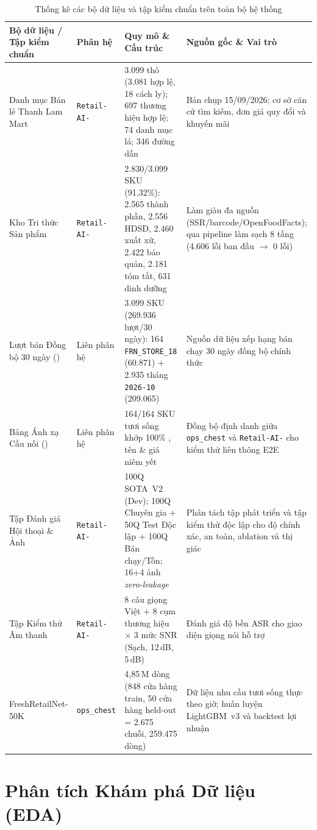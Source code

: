 \begin{table}[H]
\centering
\caption{Thống kê các bộ dữ liệu và tập kiểm chuẩn trên toàn bộ hệ thống}
\label{tab:dataset_stats}
\footnotesize
\begin{tabularx}{\textwidth}{L{3.5cm} L{2.1cm} L{3.8cm} Y}
\toprule
\textbf{Bộ dữ liệu / Tập kiểm chuẩn} & \textbf{Phân hệ} & \textbf{Quy mô \& Cấu trúc} & \textbf{Nguồn gốc \& Vai trò} \\
\midrule
Danh mục Bán lẻ Thanh Lam Mart & \texttt{Retail-AI-} & 3.099 thô (3.081 hợp lệ, 18 cách ly); 697 thương hiệu hợp lệ; 74 danh mục lá; 346 đường dẫn & Bản chụp 15/09/2026; cơ sở căn cứ tìm kiếm, đơn giá quy đổi và khuyến mãi \\
Kho Tri thức Sản phẩm & \texttt{Retail-AI-} & 2.830/3.099 SKU (91,32\%): 2.565 thành phần, 2.556 HDSD, 2.460 xuất xứ, 2.422 bảo quản, 2.181 tóm tắt, 631 dinh dưỡng & Làm giàu đa nguồn (SSR/barcode/OpenFoodFacts); qua pipeline làm sạch 8 tầng (4.606 lỗi ban đầu $\to$ 0 lỗi) \\
Lượt bán Đồng bộ 30 ngày () & Liên phân hệ & 3.099 SKU (269.936 lượt/30 ngày): 164 \texttt{FRN\_STORE\_18} (60.871) + 2.935 tháng \texttt{2026-10} (209.065) & Nguồn dữ liệu xếp hạng bán chạy 30 ngày đồng bộ chính thức \\
Bảng Ánh xạ Cầu nối () & Liên phân hệ & 164/164 SKU tươi sống khớp 100\% , tên \& giá niêm yết & Đồng bộ định danh giữa \texttt{ops\_chest} và \texttt{Retail-AI-} cho kiểm thử liên thông E2E \\
Tập Đánh giá Hội thoại \& Ảnh & \texttt{Retail-AI-} & 100Q SOTA~V2 (Dev); 100Q Chuyên gia + 50Q Test Độc lập + 100Q Bán chạy/Tồn; 16+4 ảnh \emph{zero-leakage} & Phân tách tập phát triển và tập kiểm thử độc lập cho độ chính xác, an toàn, ablation và thị giác \\
Tập Kiểm thử Âm thanh & \texttt{Retail-AI-} & 8 câu giọng Việt + 8 cụm thương hiệu $\times$ 3 mức SNR (Sạch, 12\,dB, 5\,dB) & Đánh giá độ bền ASR cho giao diện giọng nói hỗ trợ \\
FreshRetailNet-50K~\cite{freshretailnet50k} & \texttt{ops\_chest} & 4,85\,M dòng (848 cửa hàng train, 50 cửa hàng held-out = 2.675 chuỗi, 259.475 dòng) & Dữ liệu nhu cầu tươi sống thực theo giờ; huấn luyện LightGBM~v3 và backtest lợi nhuận \\
\bottomrule
\end{tabularx}
\end{table}

\section{Phân tích Khám phá Dữ liệu (EDA)}

